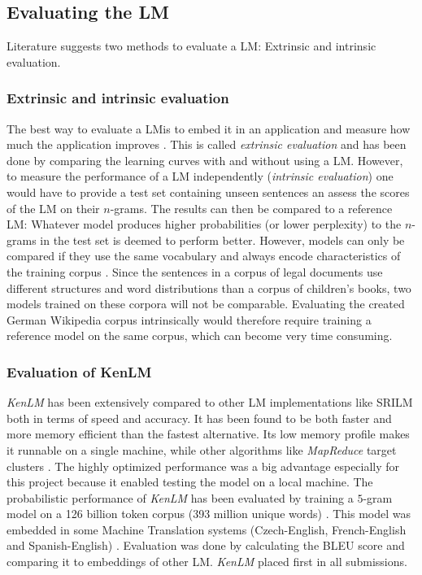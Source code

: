 \subsection{Evaluating the \ac{LM}}

Literature suggests two methods to evaluate a \ac{LM}: Extrinsic and intrinsic evaluation.

\subsubsection{Extrinsic and intrinsic evaluation}

The best way to evaluate a \ac{LM}is to embed it in an application and measure how much the application improves \parencite{slp3}. This is called \textit{extrinsic evaluation} and has been done by comparing the learning curves with and without using a \ac{LM}. However, to measure the performance of a \ac{LM} independently (\textit{intrinsic evaluation}) one would have to provide a test set containing unseen sentences an assess the scores of the \ac{LM} on their $n$-grams. The results can then be compared to a reference \ac{LM}: Whatever model produces higher probabilities (or lower perplexity) to the $n$-grams in the test set is deemed to perform better. However, models can only be compared if they use the same vocabulary and always encode characteristics of the training corpus \parencite{slp3}. Since the sentences in a corpus of legal documents use different structures and word distributions than a corpus of children's books, two models trained on these corpora will not be comparable. Evaluating the created German Wikipedia corpus intrinsically would therefore require training a reference model on the same corpus, which can become very time consuming.

\subsubsection{Evaluation of KenLM}

\textit{KenLM} has been extensively compared to other \ac{LM} implementations like \ac{SRILM} both in terms of speed and accuracy. It has been found to be both faster and more memory efficient \parencite{kenlm} than the fastest alternative. Its low memory profile makes it runnable on a single machine, while other algorithms like \textit{MapReduce} target clusters \parencite{kenlm_estimation}. The highly optimized performance was a big advantage especially for this project because it enabled testing the model on a local machine. The probabilistic performance of \textit{KenLM} has been evaluated by training a $5$-gram model on a 126 billion token corpus (393 million unique words) \parencite{kenlm_estimation}. This model was embedded in some Machine Translation systems (Czech-English, French-English and Spanish-English) . Evaluation was done by calculating the BLEU score and comparing it to embeddings of other \ac{LM}. \textit{KenLM} placed first in all submissions.

